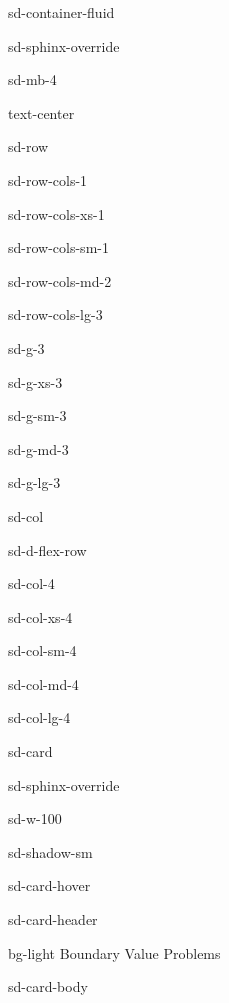 \documentclass[letterpaper,10pt,english]{jupyterBook}
\begin{document}
\begin{sphinxuseclass}{sd-container-fluid}
\begin{sphinxuseclass}{sd-sphinx-override}
\begin{sphinxuseclass}{sd-mb-4}
\begin{sphinxuseclass}{text-center}
\begin{sphinxuseclass}{sd-row}
\begin{sphinxuseclass}{sd-row-cols-1}
\begin{sphinxuseclass}{sd-row-cols-xs-1}
\begin{sphinxuseclass}{sd-row-cols-sm-1}
\begin{sphinxuseclass}{sd-row-cols-md-2}
\begin{sphinxuseclass}{sd-row-cols-lg-3}
\begin{sphinxuseclass}{sd-g-3}
\begin{sphinxuseclass}{sd-g-xs-3}
\begin{sphinxuseclass}{sd-g-sm-3}
\begin{sphinxuseclass}{sd-g-md-3}
\begin{sphinxuseclass}{sd-g-lg-3}
\begin{sphinxuseclass}{sd-col}
\begin{sphinxuseclass}{sd-d-flex-row}
\begin{sphinxuseclass}{sd-col-4}
\begin{sphinxuseclass}{sd-col-xs-4}
\begin{sphinxuseclass}{sd-col-sm-4}
\begin{sphinxuseclass}{sd-col-md-4}
\begin{sphinxuseclass}{sd-col-lg-4}
\begin{sphinxuseclass}{sd-card}
\begin{sphinxuseclass}{sd-sphinx-override}
\begin{sphinxuseclass}{sd-w-100}
\begin{sphinxuseclass}{sd-shadow-sm}
\begin{sphinxuseclass}{sd-card-hover}
\begin{sphinxuseclass}{sd-card-header}
\begin{sphinxuseclass}{bg-light}
\sphinxAtStartPar
Boundary Value Problems

\end{sphinxuseclass}
\end{sphinxuseclass}
\begin{sphinxuseclass}{sd-card-body}
\begin{figure}[htbp]
\centering

\noindent{}
\end{figure}


\end{sphinxuseclass}
\end{sphinxuseclass}
\end{sphinxuseclass}
\end{sphinxuseclass}
\end{sphinxuseclass}
\end{sphinxuseclass}
\end{sphinxuseclass}
\end{sphinxuseclass}
\end{sphinxuseclass}
\end{sphinxuseclass}
\end{sphinxuseclass}
\end{sphinxuseclass}
\end{sphinxuseclass}
\end{sphinxuseclass}
\end{sphinxuseclass}
\end{sphinxuseclass}
\end{sphinxuseclass}
\end{sphinxuseclass}
\end{sphinxuseclass}
\end{sphinxuseclass}
\end{sphinxuseclass}
\end{sphinxuseclass}
\end{sphinxuseclass}
\end{sphinxuseclass}
\end{sphinxuseclass}
\end{sphinxuseclass}
\end{sphinxuseclass}
\end{sphinxuseclass}
\end{document}
